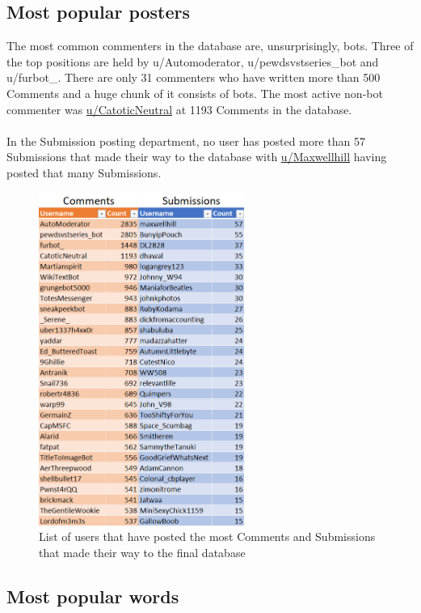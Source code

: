 \documentclass[openany]{article}
\begin{document}
\subsection{Most popular posters}
The most common commenters in the database are, unsurprisingly, bots. Three of the top positions are held by u/Automoderator, u/pewdsvstseries\_bot and u/furbot\_. There are only 31 commenters who have written more than 500 Comments and a huge chunk of it consists of bots. The most active non-bot commenter was \href{https://www.reddit.com/user/catoticneutral/comments/}{u/CatoticNeutral} at 1193 Comments in the database. \\ \\
In the Submission posting department, no user has posted more than 57 Submissions that made their way to the database with \href{https://www.reddit.com/user/maxwellhill}{u/Maxwellhill} having posted that many Submissions.
\begin{figure}[H]
    \centering
    \includegraphics[width=0.6\textwidth]{Posters.png}
    \caption{List of users that have posted the most Comments and Submissions that made their way to the final database}
    \label{fig:mesh1}
\end{figure}

\subsection{Most popular words}
\end{document}
